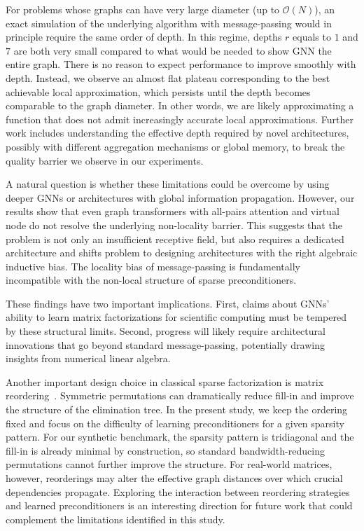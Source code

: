 \documentclass[10pt]{article} %
\theoremstyle{plain}
\theoremstyle{definition}
\theoremstyle{remark}
\begin{document}
For problems whose graphs can have very large diameter (up to $\mathcal{O}(N)$), an exact simulation of the underlying algorithm with message-passing would in principle require the same order of depth. In this regime, depths $r$ equals to $1$ and $7$ are both very small compared to what would be needed to show GNN the entire graph. There is no reason to expect performance to improve smoothly with depth. Instead, we observe an almost flat plateau corresponding to the best achievable local approximation, which persists until the depth becomes comparable to the graph diameter. In other words, we are likely approximating a function that does not admit increasingly accurate local approximations. Further work includes understanding the effective depth required by novel architectures, possibly with different aggregation mechanisms or global memory, to break the quality barrier we observe in our experiments.

A natural question is whether these limitations could be overcome by using deeper GNNs or architectures with global information propagation. However, our results show that even graph transformers with all-pairs attention and virtual node do not resolve the underlying non-locality barrier. This suggests that the problem is not only an insufficient receptive field, but also requires a dedicated architecture and shifts problem to designing architectures with the right algebraic inductive bias. The locality bias of message-passing is fundamentally incompatible with the non-local structure of sparse preconditioners.

These findings have two important implications. First, claims about GNNs’ ability to learn matrix factorizations for scientific computing must be tempered by these structural limits. Second, progress will likely require architectural innovations that go beyond standard message-passing, potentially drawing insights from numerical linear algebra.

Another important design choice in classical sparse factorization is matrix reordering~\citep{amestoy1996approximate, davis2004column}. Symmetric permutations can dramatically reduce fill-in and improve the structure of the elimination tree. In the present study, we keep the ordering fixed and focus on the difficulty of learning preconditioners for a given sparsity pattern. For our synthetic benchmark, the sparsity pattern is tridiagonal and the fill-in is already minimal by construction, so standard bandwidth-reducing permutations cannot further improve the structure. For real-world matrices, however, reorderings may alter the effective graph distances over which crucial dependencies propagate. Exploring the interaction between reordering strategies and learned preconditioners is an interesting direction for future work that could complement the limitations identified in this study.
\end{document}
